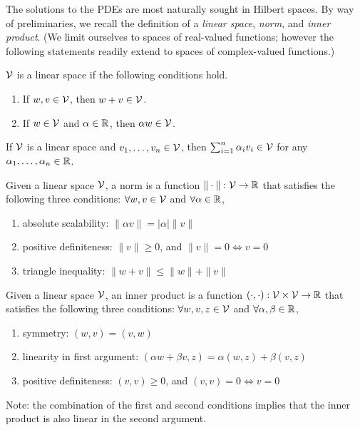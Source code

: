 The solutions to the PDEs are most naturally sought in Hilbert spaces. By way of preliminaries, we recall the definition of a \emph{linear space}, \emph{norm}, and \emph{inner product}. (We limit ourselves to spaces of real-valued functions; however the following statements readily extend to spaces of complex-valued functions.)
\begin{definition}
  $\mathcal{V}$ is a linear space if the following conditions hold.
  \begin{enumerate}
  \item If $w,v \in \mathcal{V}$, then $w + v \in \mathcal{V}$.
  \item If $w \in \mathcal{V}$ and $\alpha \in \mathbb{R}$, then $\alpha w \in \mathcal{V}$.
  \end{enumerate}
\end{definition}
\begin{remark}
  If $\mathcal{V}$ is a linear space and $v_1,\dots,v_n \in \mathcal{V}$, then $\sum_{i=1}^n \alpha_i v_i \in \mathcal{V}$ for any $\alpha_1, \dots, \alpha_n \in \mathbb{R}$.
\end{remark}
\begin{definition}[norm]
  Given a linear space $\mathcal{V}$, a norm is a function $\| \cdot \| : \mathcal{V} \to \mathbb{R}$ that satisfies the following three conditions: $\forall w,v \in \mathcal{V}$ and $\forall \alpha \in \mathbb{R}$, 
  \begin{enumerate}
  \item absolute scalability: $\| \alpha v \| = |\alpha| \| v \|$
  \item positive definiteness: $ \| v \| \geq 0$,  and $\| v \| = 0 \Leftrightarrow v = 0$
  \item triangle inequality: $  \| w + v \| \leq \| w \| + \| v \| $
  \end{enumerate}
\end{definition}
\begin{definition}
  Given a linear space $\mathcal{V}$, an inner product is a function $(\cdot,\cdot): \mathcal{V} \times \mathcal{V} \to \mathbb{R}$ that satisfies the following three conditions: $\forall w,v,z \in \mathcal{V}$ and $\forall \alpha,\beta \in \mathbb{R}$,
\begin{enumerate}
\item symmetry: $(w,v) = (v,w)$
\item linearity in first argument: $ (\alpha w + \beta v, z) = \alpha (w,z) + \beta (v,z)$
\item positive definiteness: $ (v,v) \geq 0$, and $(v,v) = 0 \Leftrightarrow v = 0 $
\end{enumerate}
Note: the combination of the first and second conditions implies that the inner product is also linear in the second argument.
\end{definition}
